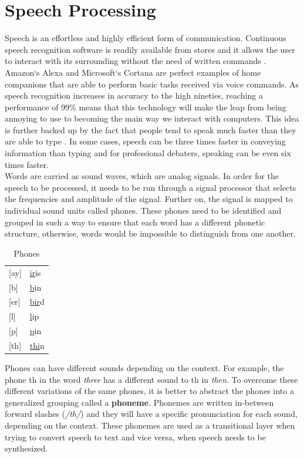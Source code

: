 \chapter{Speech Processing}\label{ch:speech_processing}

Speech is an effortless and highly efficient form of communication. Continuous speech recognition software is readily available from stores and it allows the user to interact with its surrounding without the need of written commands \cite[p.~396]{callan2003artificial}. Amazon`s Alexa \cite{Alexa} and Microsoft`s Cortana \cite{Cortana} are perfect examples of home companions that are able to perform basic tasks received via voice commands. As speech recognition increases in accuracy to the high nineties, reaching a performance of 99\% means that this technology will make the leap from being annoying to use to becoming the main way we interact with computers. This idea is further backed up by the fact that people tend to speak much faster than they are able to type \cite{Speed}. In some cases, speech can be three times faster in conveying information than typing and for professional debaters, speaking can be even six times faster. \\

Words are carried as sound waves, which are analog signals. In order for the speech to be processed, it needs to be run through a signal processor that selects the frequencies and amplitude of the signal. Further on, the signal is mapped to individual sound units called phones. These phones need to be identified and grouped in such a way to ensure that each word has a different phonetic structure, otherwise, words would be impossible to distinguish from one another. \\

\begin{table}[]
\centering
\caption{Phones}
\label{my-label}
\begin{tabular}{ll}
{[}ay{]} & \underline{ir}is \\
{[}b{]}  & \underline{b}in  \\
{[}er{]} & \underline{bir}d \\
{[}l{]}  & \underline{l}ip  \\
{[}p{]}  & \underline{p}in  \\
{[}th{]} & \underline{thi}n
\end{tabular}
\end{table}

Phones can have different sounds depending on the context. For example, the phone th in the word \textit{three} has a different sound to th in \textit{then}. To overcome these different variations of the same phones, it is better to abstract the phones into a generalized grouping called a \textbf{phoneme}. Phonemes are written in-between forward slashes (\textit{/th/}) and they will have a specific pronunciation for each sound, depending on the context. These phonemes are used as a transitional layer when trying to convert speech to text and vice versa, when speech needs to be synthesized.\\

